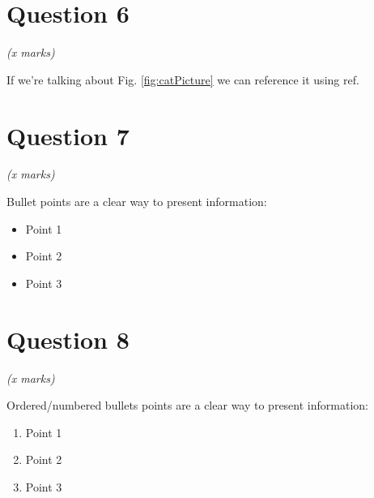 \documentclass[11pt,fleqn]{book} %
\begin{document}
\newpage %

\section{Question 6}

\begin{flushright}
    \textit{(x marks)}
\end{flushright}

If we're talking about Fig. \ref{fig:catPicture} we can reference it using ref.

\section{Question 7}

\begin{flushright}
    \textit{(x marks)}
\end{flushright}

Bullet points are a clear way to present information:

\vspace{0.5cm} %

\begin{itemize}
    \item Point 1
    \item Point 2
    \item Point 3
\end{itemize}

\section{Question 8}

\begin{flushright}
    \textit{(x marks)}
\end{flushright}

Ordered/numbered bullets points are a clear way to present information:

\vspace{0.5cm} %

\begin{enumerate}
    \item Point 1
    \item Point 2
    \item Point 3 \cite{catsProtection}
\end{enumerate}


\end{document}
